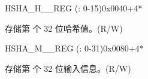 \begin{register}{H}{SHA\_H\_\_REG (: 0-15)}{0x{}0040+4*}\label{regdesc:SHAHNREG}
%
\regnewline%
\begin{regdesc}\begin{reglist}
\label{fielddesc:SHAH0}\item [SHA\_H\_\regindex{n}] 存储第  个 32 位哈希值。(R/W)
\end{reglist}\end{regdesc}
\end{register}


\begin{register}{H}{SHA\_M\_\_REG (: 0-31)}{0x{}0080+4*}\label{regdesc:SHAMNREG}
%
\begin{regdesc}\begin{reglist}
\label{fielddesc:SHAM0}\item [SHA\_M\_\regindex{n}] 存储第  个 32 位输入信息。(R/W)
\end{reglist}\end{regdesc}
\end{register}